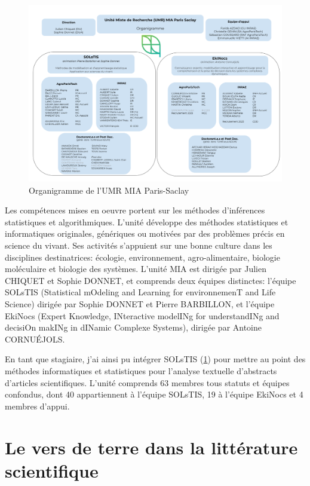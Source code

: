 \documentclass{book}
\begin{document}
\begin{figure}[h] %
    \begin{center} %
        \includegraphics[width=12cm]{organigrammeEquipe.png}
        \caption{Organigramme de l'UMR MIA Paris-Saclay}\label{fig_organigrame}
    \end{center}
\end{figure}
Les compétences mises en oeuvre portent sur les méthodes d’inférences statistiques et algorithmiques. L’unité développe des méthodes statistiques et informatiques originales, \sloppy génériques ou motivées par des problèmes précis en science du vivant. Ses activités s’appuient sur une bonne culture dans les disciplines destinatrices: écologie, environnement, agro-alimentaire, biologie moléculaire et biologie des systèmes.
L'unité MIA est dirigée par Julien CHIQUET et Sophie
DONNET, et comprends deux équipes distinctes: l'équipe SOLsTIS (Statistical
mOdeling and Learning for environnemenT and Life Science) dirigée par Sophie
DONNET et Pierre BARBILLON, et l'équipe EkiNocs (Expert Knowledge, INteractive
modelINg for understandINg and decisiOn makINg in dINamic Complexe Systems),
dirigée par Antoine CORNU\'{E}JOLS.

En tant que stagiaire, j'ai ainsi pu intégrer SOLsTIS (\cref{fig_organigrame}) pour mettre au point des
méthodes informatiques et statistiques pour l'analyse textuelle d'abstracts
d'articles scientifiques. L'unité comprends 63 membres tous statuts et équipes
confondus, dont 40 appartiennent à l'équipe SOLsTIS, 19 à l'équipe EkiNocs et 4
membres d'appui. 

\thispagestyle{fancy}

\section{Le vers de terre dans la littérature scientifique}
\end{document}
